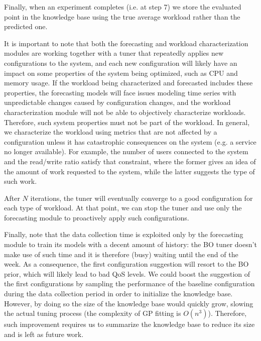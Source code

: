 \documentclass[a4paper, 12pt]{article} %
\begin{document}
	Finally, when an experiment completes (i.e. at step 7) we store the evaluated point in the knowledge base using the true average workload rather than the predicted one.
	
	It is important to note that both the forecasting and workload characterization modules are working together with a tuner that repeatedly applies new configurations to the system, and each new configuration will likely have an impact on some properties of the system being optimized, such as CPU and memory usage. If the workload being characterized and forecasted includes these properties, the forecasting models will face issues modeling time series with unpredictable changes caused by configuration changes, and the workload characterization module will not be able to objectively characterize workloads. Therefore, such system properties must not be part of the workload. In general, we characterize the workload using metrics that are not affected by a configuration unless it has catastrophic consequences on the system (e.g. a service no longer available). For example, the number of users connected to the system and the read/write ratio satisfy that constraint, where the former gives an idea of the amount of work requested to the system, while the latter suggests the type of such work.
	
	After $N$ iterations, the tuner will eventually converge to a good configuration for each type of workload. At that point, we can stop the tuner and use only the forecasting module to proactively apply such configurations.
	
	Finally, note that the data collection time is exploited only by the forecasting module to train its models with a decent amount of history: the BO tuner doesn't make use of such time and it is therefore (busy) waiting until the end of the week. As a consequence, the first configuration suggestion will resort to the BO prior, which will likely lead to bad QoS levels. We could boost the suggestion of the first configurations by sampling the performance of the baseline configuration during the data collection period in order to initialize the knowledge base. However, by doing so the size of the knowledge base would quickly grow, slowing the actual tuning process (the complexity of GP fitting is $O(n^3)$). Therefore, such improvement requires us to summarize the knowledge base to reduce its size and is left as future work.
	
\end{document}
